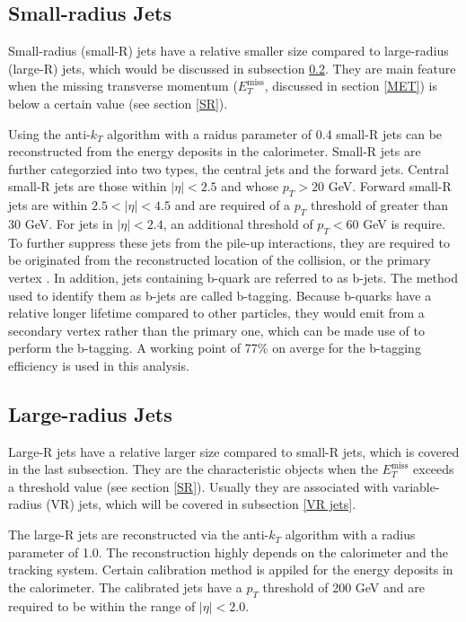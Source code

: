 \documentclass[class=NCU_thesis, crop=false]{standalone}
\begin{document}
	\subsection{Small-radius Jets}
		Small-radius (small-R) jets have a relative smaller size compared to large-radius (large-R) jets, which would be discussed in subsection \ref{large-R jets}. They are main feature when the missing transverse momentum ($E_T^{\mathrm{miss}}$, discussed in section \ref{MET}) is below a certain value (see section \ref{SR}).
	
		Using the anti-$k_T$ algorithm with a raidus parameter of 0.4 small-R jets can be reconstructed from the energy deposits in the calorimeter. Small-R jets are further categorzied into two types, the central jets and the forward jets. Central small-R jets are those within $\lvert \eta \rvert < 2.5$ and whose $p_T > 20$ GeV. Forward small-R jets are within $2.5 < \lvert \eta \rvert < 4.5$ and are required of a $p_T$ threshold of greater than 30 GeV. For jets in $\lvert \eta \rvert < 2.4$, an additional threshold of $p_T < 60$ GeV is require. To further suppress these jets from the pile-up interactions, they are required to be originated from the reconstructed location of the collision, or the primary vertex \cite{1512.01094}. In addition, jets containing b-quark are referred to as b-jets. The method used to identify them as b-jets are called b-tagging. Because b-quarks have a relative longer lifetime compared to other particles, they would emit from a secondary vertex rather than the primary one, which can be made use of to perform the b-tagging. A working point of 77\% on averge for the b-tagging efficiency is used in this analysis.
	
	\subsection{Large-radius Jets}\label{large-R jets}
		Large-R jets have a relative larger size compared to small-R jets, which is covered in the last subsection. They are the characteristic objects when the $E_T^{\mathrm{miss}}$ exceeds a threshold value (see section \ref{SR}). Usually they are associated with variable-radius (VR) jets, which will be covered in subsection \ref{VR jets}.
		
		The large-R jets are reconstructed via the anti-$k_T$ algorithm with a radius parameter of 1.0. The reconstruction highly depends on the calorimeter and the tracking system. Certain calibration method is appiled for the energy deposits in the calorimeter. The calibrated jets have a $p_T$ threshold of 200 GeV and are required to be within the range of $\lvert \eta \rvert < 2.0$.
	
\end{document}
